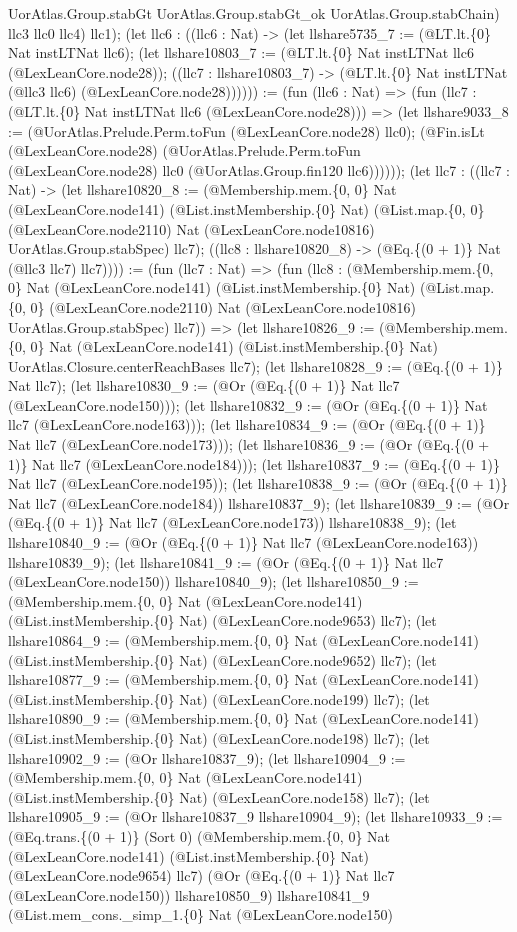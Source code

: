 \documentclass[11pt]{article}
\begin{document}
UorAtlas.Group.stabGt UorAtlas.Group.stabGt\_ok UorAtlas.Group.stabChain) llc3 llc0 llc4) llc1); (let llc6 : ((llc6 : Nat) -> (let llshare5735\_7 := (@LT.lt.\{0\} Nat instLTNat llc6); (let llshare10803\_7 := (@LT.lt.\{0\} Nat instLTNat llc6 (@LexLeanCore.node28)); ((llc7 : llshare10803\_7) -> (@LT.lt.\{0\} Nat instLTNat (@llc3 llc6) (@LexLeanCore.node28)))))) := (fun (llc6 : Nat) => (fun (llc7 : (@LT.lt.\{0\} Nat instLTNat llc6 (@LexLeanCore.node28))) => (let llshare9033\_8 := (@UorAtlas.Prelude.Perm.toFun (@LexLeanCore.node28) llc0); (@Fin.isLt (@LexLeanCore.node28) (@UorAtlas.Prelude.Perm.toFun (@LexLeanCore.node28) llc0 (@UorAtlas.Group.fin120 llc6)))))); (let llc7 : ((llc7 : Nat) -> (let llshare10820\_8 := (@Membership.mem.\{0, 0\} Nat (@LexLeanCore.node141) (@List.instMembership.\{0\} Nat) (@List.map.\{0, 0\} (@LexLeanCore.node2110) Nat (@LexLeanCore.node10816) UorAtlas.Group.stabSpec) llc7); ((llc8 : llshare10820\_8) -> (@Eq.\{(0 + 1)\} Nat (@llc3 llc7) llc7)))) := (fun (llc7 : Nat) => (fun (llc8 : (@Membership.mem.\{0, 0\} Nat (@LexLeanCore.node141) (@List.instMembership.\{0\} Nat) (@List.map.\{0, 0\} (@LexLeanCore.node2110) Nat (@LexLeanCore.node10816) UorAtlas.Group.stabSpec) llc7)) => (let llshare10826\_9 := (@Membership.mem.\{0, 0\} Nat (@LexLeanCore.node141) (@List.instMembership.\{0\} Nat) UorAtlas.Closure.centerReachBases llc7); (let llshare10828\_9 := (@Eq.\{(0 + 1)\} Nat llc7); (let llshare10830\_9 := (@Or (@Eq.\{(0 + 1)\} Nat llc7 (@LexLeanCore.node150))); (let llshare10832\_9 := (@Or (@Eq.\{(0 + 1)\} Nat llc7 (@LexLeanCore.node163))); (let llshare10834\_9 := (@Or (@Eq.\{(0 + 1)\} Nat llc7 (@LexLeanCore.node173))); (let llshare10836\_9 := (@Or (@Eq.\{(0 + 1)\} Nat llc7 (@LexLeanCore.node184))); (let llshare10837\_9 := (@Eq.\{(0 + 1)\} Nat llc7 (@LexLeanCore.node195)); (let llshare10838\_9 := (@Or (@Eq.\{(0 + 1)\} Nat llc7 (@LexLeanCore.node184)) llshare10837\_9); (let llshare10839\_9 := (@Or (@Eq.\{(0 + 1)\} Nat llc7 (@LexLeanCore.node173)) llshare10838\_9); (let llshare10840\_9 := (@Or (@Eq.\{(0 + 1)\} Nat llc7 (@LexLeanCore.node163)) llshare10839\_9); (let llshare10841\_9 := (@Or (@Eq.\{(0 + 1)\} Nat llc7 (@LexLeanCore.node150)) llshare10840\_9); (let llshare10850\_9 := (@Membership.mem.\{0, 0\} Nat (@LexLeanCore.node141) (@List.instMembership.\{0\} Nat) (@LexLeanCore.node9653) llc7); (let llshare10864\_9 := (@Membership.mem.\{0, 0\} Nat (@LexLeanCore.node141) (@List.instMembership.\{0\} Nat) (@LexLeanCore.node9652) llc7); (let llshare10877\_9 := (@Membership.mem.\{0, 0\} Nat (@LexLeanCore.node141) (@List.instMembership.\{0\} Nat) (@LexLeanCore.node199) llc7); (let llshare10890\_9 := (@Membership.mem.\{0, 0\} Nat (@LexLeanCore.node141) (@List.instMembership.\{0\} Nat) (@LexLeanCore.node198) llc7); (let llshare10902\_9 := (@Or llshare10837\_9); (let llshare10904\_9 := (@Membership.mem.\{0, 0\} Nat (@LexLeanCore.node141) (@List.instMembership.\{0\} Nat) (@LexLeanCore.node158) llc7); (let llshare10905\_9 := (@Or llshare10837\_9 llshare10904\_9); (let llshare10933\_9 := (@Eq.trans.\{(0 + 1)\} (Sort 0) (@Membership.mem.\{0, 0\} Nat (@LexLeanCore.node141) (@List.instMembership.\{0\} Nat) (@LexLeanCore.node9654) llc7) (@Or (@Eq.\{(0 + 1)\} Nat llc7 (@LexLeanCore.node150)) llshare10850\_9) llshare10841\_9 (@List.mem\_cons.\_simp\_1.\{0\} Nat (@LexLeanCore.node150) 
\end{document}

